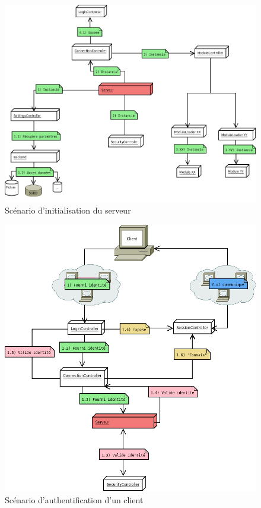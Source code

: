 \begin{figure}[thbp]
	\centering
		\includegraphics[angle=90,scale=0.6]{../diagrammes/init_server.png}
	\caption{Scénario d'initialisation du serveur}
	\label{fig:init_server}
\end{figure}

\begin{figure}[thbp]
	\centering
		\includegraphics[scale=0.6]{../diagrammes/auth_client.png}
	\caption{Scénario d'authentification d'un client}
	\label{fig:auth_client}
\end{figure}

